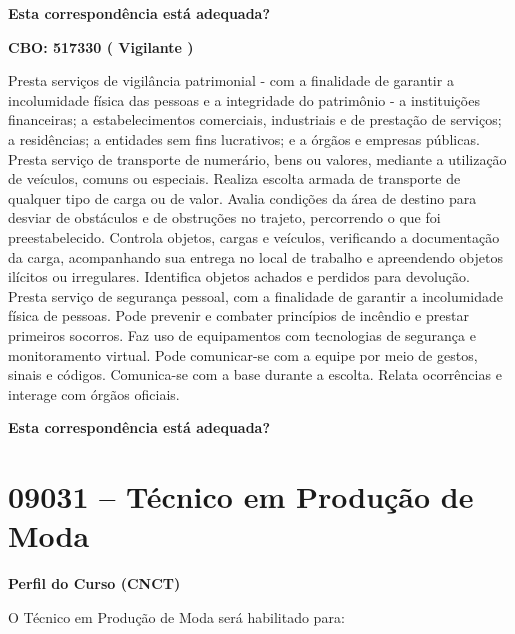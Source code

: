 \documentclass[
]{article}
\begin{document}
\begin{Form}
\textbf{Esta correspondência está adequada?} \\ 
\end{Form}

\textbf{CBO: 517330  ( Vigilante )}

Presta serviços de vigilância patrimonial - com a finalidade de garantir
a incolumidade física das pessoas e a integridade do patrimônio - a
instituições financeiras; a estabelecimentos comerciais, industriais e
de prestação de serviços; a residências; a entidades sem fins
lucrativos; e a órgãos e empresas públicas. Presta serviço de transporte
de numerário, bens ou valores, mediante a utilização de veículos, comuns
ou especiais. Realiza escolta armada de transporte de qualquer tipo de
carga ou de valor. Avalia condições da área de destino para desviar de
obstáculos e de obstruções no trajeto, percorrendo o que foi
preestabelecido. Controla objetos, cargas e veículos, verificando a
documentação da carga, acompanhando sua entrega no local de trabalho e
apreendendo objetos ilícitos ou irregulares. Identifica objetos achados
e perdidos para devolução. Presta serviço de segurança pessoal, com a
finalidade de garantir a incolumidade física de pessoas. Pode prevenir e
combater princípios de incêndio e prestar primeiros socorros. Faz uso de
equipamentos com tecnologias de segurança e monitoramento virtual. Pode
comunicar-se com a equipe por meio de gestos, sinais e códigos.
Comunica-se com a base durante a escolta. Relata ocorrências e interage
com órgãos oficiais.

\begin{Form}
\textbf{Esta correspondência está adequada?} \\ 
\end{Form}

\newpage
\section{ 09031 -- Técnico em Produção de Moda }

\textbf{Perfil do Curso (CNCT)}

O Técnico em Produção de Moda será habilitado para:
\end{document}
